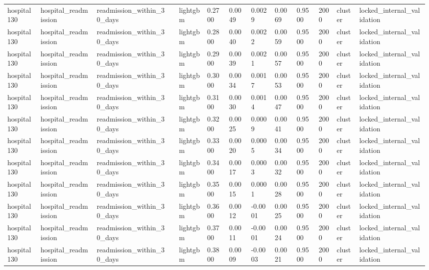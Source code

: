 \begin{tabular}{lllllllllllll}
hospital130 & hospital\_readmission & readmission\_within\_30\_days &  & lightgbm & 0.2700 & 0.0049 & 0.0029 & 0.0069 & 0.9500 & 2000 & cluster & locked\_internal\_validation \\
hospital130 & hospital\_readmission & readmission\_within\_30\_days &  & lightgbm & 0.2800 & 0.0040 & 0.0022 & 0.0059 & 0.9500 & 2000 & cluster & locked\_internal\_validation \\
hospital130 & hospital\_readmission & readmission\_within\_30\_days &  & lightgbm & 0.2900 & 0.0039 & 0.0021 & 0.0057 & 0.9500 & 2000 & cluster & locked\_internal\_validation \\
hospital130 & hospital\_readmission & readmission\_within\_30\_days &  & lightgbm & 0.3000 & 0.0034 & 0.0017 & 0.0053 & 0.9500 & 2000 & cluster & locked\_internal\_validation \\
hospital130 & hospital\_readmission & readmission\_within\_30\_days &  & lightgbm & 0.3100 & 0.0030 & 0.0014 & 0.0047 & 0.9500 & 2000 & cluster & locked\_internal\_validation \\
hospital130 & hospital\_readmission & readmission\_within\_30\_days &  & lightgbm & 0.3200 & 0.0025 & 0.0009 & 0.0041 & 0.9500 & 2000 & cluster & locked\_internal\_validation \\
hospital130 & hospital\_readmission & readmission\_within\_30\_days &  & lightgbm & 0.3300 & 0.0020 & 0.0005 & 0.0034 & 0.9500 & 2000 & cluster & locked\_internal\_validation \\
hospital130 & hospital\_readmission & readmission\_within\_30\_days &  & lightgbm & 0.3400 & 0.0017 & 0.0003 & 0.0032 & 0.9500 & 2000 & cluster & locked\_internal\_validation \\
hospital130 & hospital\_readmission & readmission\_within\_30\_days &  & lightgbm & 0.3500 & 0.0015 & 0.0001 & 0.0028 & 0.9500 & 2000 & cluster & locked\_internal\_validation \\
hospital130 & hospital\_readmission & readmission\_within\_30\_days &  & lightgbm & 0.3600 & 0.0012 & -0.0001 & 0.0025 & 0.9500 & 2000 & cluster & locked\_internal\_validation \\
hospital130 & hospital\_readmission & readmission\_within\_30\_days &  & lightgbm & 0.3700 & 0.0011 & -0.0001 & 0.0024 & 0.9500 & 2000 & cluster & locked\_internal\_validation \\
hospital130 & hospital\_readmission & readmission\_within\_30\_days &  & lightgbm & 0.3800 & 0.0009 & -0.0003 & 0.0021 & 0.9500 & 2000 & cluster & locked\_internal\_validation \\

\end{tabular}
